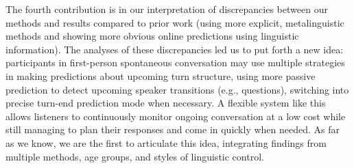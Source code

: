 \documentclass[11pt,a4paper]{letter} %
\begin{document}
\begin{letter}{}
The fourth contribution is in our interpretation of discrepancies between our methods and results compared to prior work (using more explicit, metalinguistic methods and showing more obvious online predictions using linguistic information). The analyses of these discrepancies led us to put forth a new idea: participants in first-person spontaneous conversation may use multiple strategies in making predictions about upcoming turn structure, using more passive prediction to detect upcoming speaker transitions (e.g., questions), switching into precise turn-end prediction mode when necessary. A flexible system like this allows listeners to continuously monitor ongoing conversation at a low cost while still managing to plan their responses and come in quickly when needed. As far as we know, we are the first to articulate this idea, integrating findings from multiple methods, age groups, and styles of linguistic control.



\end{letter}
\end{document}
